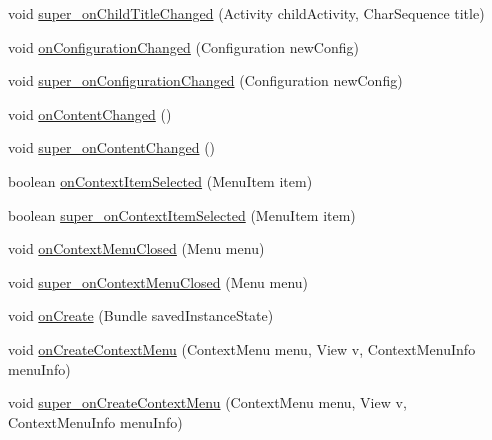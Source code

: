 \begin{DoxyCompactItemize}
void \hyperlink{classorg_1_1qtproject_1_1qt5_1_1android_1_1bindings_1_1_qt_activity_ac369eb38a2ea1f7a0d61c44a30d63620}{super\-\_\-on\-Child\-Title\-Changed} (Activity child\-Activity, Char\-Sequence title)
\item 
void \hyperlink{classorg_1_1qtproject_1_1qt5_1_1android_1_1bindings_1_1_qt_activity_a75ef70261caa7d4db3041147dc46c5d0}{on\-Configuration\-Changed} (Configuration new\-Config)
\item 
void \hyperlink{classorg_1_1qtproject_1_1qt5_1_1android_1_1bindings_1_1_qt_activity_a1c7f2e1b1ce16f2bfa70f38d88740565}{super\-\_\-on\-Configuration\-Changed} (Configuration new\-Config)
\item 
void \hyperlink{classorg_1_1qtproject_1_1qt5_1_1android_1_1bindings_1_1_qt_activity_a6310ffd404267a66b52dd4c3b357b560}{on\-Content\-Changed} ()
\item 
void \hyperlink{classorg_1_1qtproject_1_1qt5_1_1android_1_1bindings_1_1_qt_activity_a65dc57b70d42eb56f6bc12f7e0c49022}{super\-\_\-on\-Content\-Changed} ()
\item 
boolean \hyperlink{classorg_1_1qtproject_1_1qt5_1_1android_1_1bindings_1_1_qt_activity_a67108692da62e48e5d02b22ed3d83769}{on\-Context\-Item\-Selected} (Menu\-Item item)
\item 
boolean \hyperlink{classorg_1_1qtproject_1_1qt5_1_1android_1_1bindings_1_1_qt_activity_a7281a498436213e739110753b357c0bd}{super\-\_\-on\-Context\-Item\-Selected} (Menu\-Item item)
\item 
void \hyperlink{classorg_1_1qtproject_1_1qt5_1_1android_1_1bindings_1_1_qt_activity_a3e845800dc8fc21ff23589005d1a781c}{on\-Context\-Menu\-Closed} (Menu menu)
\item 
void \hyperlink{classorg_1_1qtproject_1_1qt5_1_1android_1_1bindings_1_1_qt_activity_a1b845060cb1ae8dde9bb8a60339b9468}{super\-\_\-on\-Context\-Menu\-Closed} (Menu menu)
\item 
void \hyperlink{classorg_1_1qtproject_1_1qt5_1_1android_1_1bindings_1_1_qt_activity_aa826639406d6f0697e0f1afcf69c748c}{on\-Create} (Bundle saved\-Instance\-State)
\item 
void \hyperlink{classorg_1_1qtproject_1_1qt5_1_1android_1_1bindings_1_1_qt_activity_a924489f96650a755cf63980f3d388e8e}{on\-Create\-Context\-Menu} (Context\-Menu menu, View v, Context\-Menu\-Info menu\-Info)
\item 
void \hyperlink{classorg_1_1qtproject_1_1qt5_1_1android_1_1bindings_1_1_qt_activity_ae235bff28fac3ae862e49a1fc52caf15}{super\-\_\-on\-Create\-Context\-Menu} (Context\-Menu menu, View v, Context\-Menu\-Info menu\-Info)

\end{DoxyCompactItemize}
